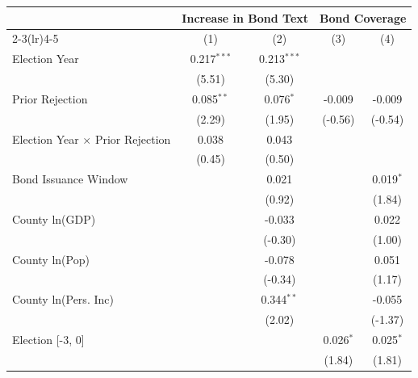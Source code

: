 \begingroup
\centering
\begin{tabular*}{\textwidth}{@{\extracolsep{\fill}}lcccc}
   \toprule
    & \multicolumn{2}{c}{Increase in Bond Text} & \multicolumn{2}{c}{Bond Coverage}\\
   \cmidrule(lr){2-3}\cmidrule(lr){4-5}
                                              & (1)           & (2)           & (3)         & (4)\\
   \midrule
   Election Year                              & 0.217$^{***}$ & 0.213$^{***}$ &             &   \\
                                              & (5.51)       & (5.30)       &             &   \\
   Prior Rejection                            & 0.085$^{**}$  & 0.076$^{*}$   & -0.009      & -0.009\\
                                              & (2.29)       & (1.95)       & (-0.56)    & (-0.54)\\
   Election Year $\times$ Prior Rejection     & 0.038         & 0.043         &             &   \\
                                              & (0.45)       & (0.50)       &             &   \\
   Bond Issuance Window                       &               & 0.021         &             & 0.019$^{*}$\\
                                              &               & (0.92)       &             & (1.84)\\
   County ln(GDP)                             &               & -0.033        &             & 0.022\\
                                              &               & (-0.30)      &             & (1.00)\\
   County ln(Pop)                             &               & -0.078        &             & 0.051\\
                                              &               & (-0.34)      &             & (1.17)\\
   County ln(Pers. Inc)                       &               & 0.344$^{**}$  &             & -0.055\\
                                              &               & (2.02)       &             & (-1.37)\\
   Election [-3, 0]                           &               &               & 0.026$^{*}$ & 0.025$^{*}$\\
                                              &               &               & (1.84)     & (1.81)\\

\end{tabular*}
